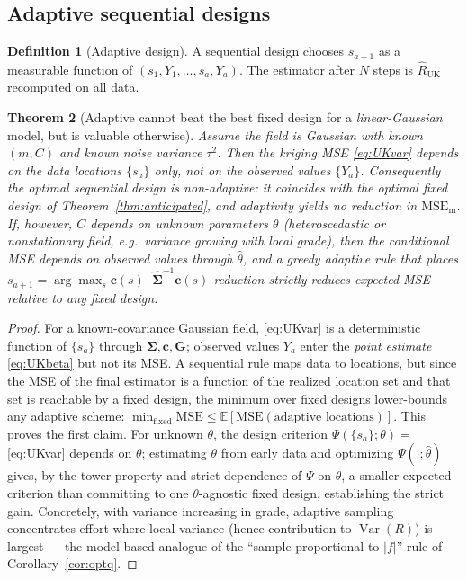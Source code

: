 \documentclass{amsart}
\newtheorem{theorem}{Theorem}
\theoremstyle{definition}
\newtheorem{definition}[theorem]{Definition}
\newcommand{\E}{\mathbb{E}}
\newcommand{\Var}{\operatorname{Var}}
\newcommand{\Rhat}{\widehat R}
\begin{document}
\subsection{Adaptive sequential designs}\label{ssec:adaptive}

\begin{definition}[Adaptive design]
A sequential design chooses $s_{a+1}$ as a measurable function of
$(s_1,Y_1,\dots,s_a,Y_a)$. The estimator after $N$ steps is
$\Rhat_{\mathrm{UK}}$ recomputed on all data.
\end{definition}

\begin{theorem}[Adaptive cannot beat the best fixed design for a
\emph{linear-Gaussian} model, but is valuable otherwise]
\label{thm:adaptive}
Assume the field is Gaussian with known $(m,C)$ and known noise variance
$\tau^2$. Then the kriging MSE \eqref{eq:UKvar} depends on the data
locations $\{s_a\}$ \emph{only}, not on the observed values $\{Y_a\}$.
Consequently the optimal sequential design is \emph{non-adaptive}: it
coincides with the optimal fixed design of
Theorem~\ref{thm:anticipated}, and adaptivity yields no reduction in
$\mathrm{MSE}_{\mathrm m}$. If, however, $C$ depends on unknown parameters
$\theta$ (heteroscedastic or nonstationary field, e.g.\ variance growing
with local grade), then the conditional MSE depends on observed values
through $\widehat\theta$, and a greedy adaptive rule that places
$s_{a+1}=\arg\max_{s}\mathbf c(s)^\top\widehat{\boldsymbol\Sigma}^{-1}
\mathbf c(s)$-reduction strictly reduces expected MSE relative to any
fixed design.
\end{theorem}
\begin{proof}
For a known-covariance Gaussian field, \eqref{eq:UKvar} is a deterministic
function of $\{s_a\}$ through $\boldsymbol\Sigma,\mathbf c,\mathbf G$;
observed values $Y_a$ enter the \emph{point estimate} \eqref{eq:UKbeta} but
not its MSE. A sequential rule maps data to locations, but since the MSE of
the final estimator is a function of the realized location set and that set
is reachable by a fixed design, the minimum over fixed designs lower-bounds
any adaptive scheme: $\min_{\text{fixed}}\mathrm{MSE}\le
\E[\mathrm{MSE}(\text{adaptive locations})]$. This proves the first claim.
For unknown $\theta$, the design criterion
$\Psi(\{s_a\};\theta)=$\eqref{eq:UKvar} depends on $\theta$; estimating
$\theta$ from early data and optimizing $\Psi(\cdot;\widehat\theta)$ gives,
by the tower property and strict dependence of $\Psi$ on $\theta$, a
smaller expected criterion than committing to one $\theta$-agnostic fixed
design, establishing the strict gain. Concretely, with variance increasing
in grade, adaptive sampling concentrates effort where local variance (hence
contribution to $\Var(R)$) is largest --- the model-based analogue of the
``sample proportional to $|f|$'' rule of Corollary~\ref{cor:optq}.
\end{proof}
\end{document}
